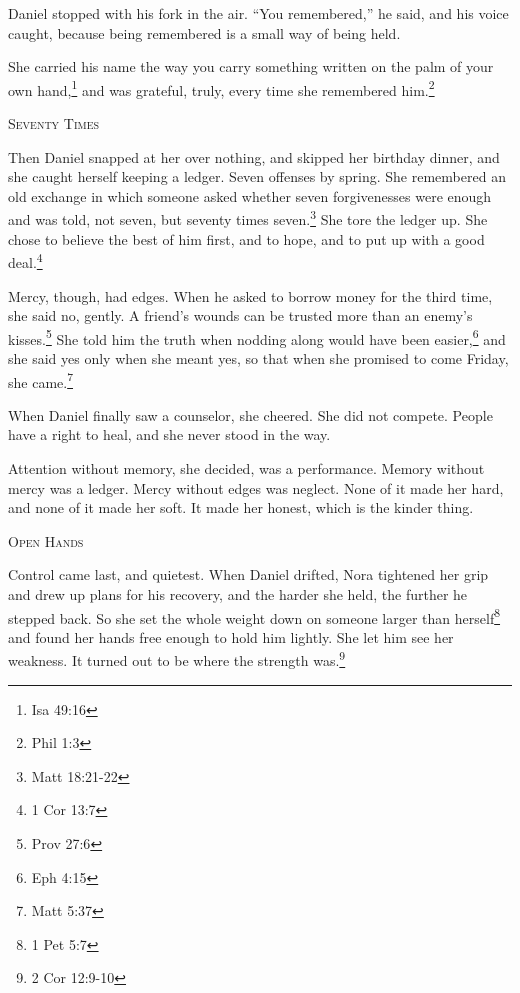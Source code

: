 \documentclass[10.5pt]{article}
\begin{document}
Daniel stopped with his fork in the air. ``You remembered,'' he said, and his voice caught, because being remembered is a small way of being held.

She carried his name the way you carry something written on the palm of your own hand,\footnote{Isa 49:16} and was grateful, truly, every time she remembered him.\footnote{Phil 1:3}

\vspace{1.5em}

\begin{center}
    {\scshape\large Seventy Times}\par
    \vspace{0.8em}
\end{center}

Then Daniel snapped at her over nothing, and skipped her birthday dinner, and she caught herself keeping a ledger. Seven offenses by spring. She remembered an old exchange in which someone asked whether seven forgivenesses were enough and was told, not seven, but seventy times seven.\footnote{Matt 18:21-22} She tore the ledger up. She chose to believe the best of him first, and to hope, and to put up with a good deal.\footnote{1 Cor 13:7}

Mercy, though, had edges. When he asked to borrow money for the third time, she said no, gently. A friend's wounds can be trusted more than an enemy's kisses.\footnote{Prov 27:6} She told him the truth when nodding along would have been easier,\footnote{Eph 4:15} and she said yes only when she meant yes, so that when she promised to come Friday, she came.\footnote{Matt 5:37}

When Daniel finally saw a counselor, she cheered. She did not compete. People have a right to heal, and she never stood in the way.

Attention without memory, she decided, was a performance. Memory without mercy was a ledger. Mercy without edges was neglect. None of it made her hard, and none of it made her soft. It made her honest, which is the kinder thing.

\newpage

\begin{center}
    {\scshape\large Open Hands}\par
    \vspace{0.8em}
\end{center}

Control came last, and quietest. When Daniel drifted, Nora tightened her grip and drew up plans for his recovery, and the harder she held, the further he stepped back. So she set the whole weight down on someone larger than herself\footnote{1 Pet 5:7} and found her hands free enough to hold him lightly. She let him see her weakness. It turned out to be where the strength was.\footnote{2 Cor 12:9-10}
\end{document}
